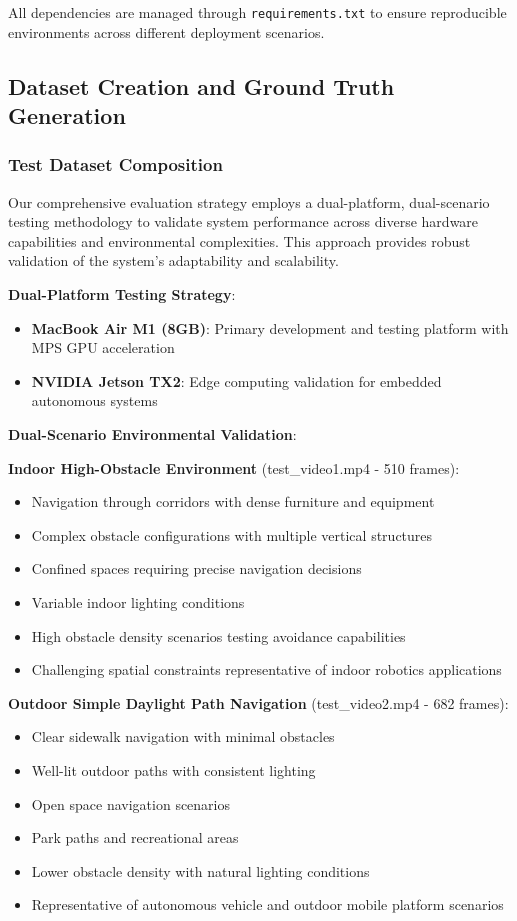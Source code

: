 \documentclass[10pt]{article}
\begin{document}
All dependencies are managed through \texttt{requirements.txt} to ensure reproducible environments across different deployment scenarios.

\subsection{Dataset Creation and Ground Truth Generation}

\subsubsection{Test Dataset Composition}

Our comprehensive evaluation strategy employs a dual-platform, dual-scenario testing methodology to validate system performance across diverse hardware capabilities and environmental complexities. This approach provides robust validation of the system's adaptability and scalability.

\textbf{Dual-Platform Testing Strategy}:
\begin{itemize}
\item \textbf{MacBook Air M1 (8GB)}: Primary development and testing platform with MPS GPU acceleration
\item \textbf{NVIDIA Jetson TX2}: Edge computing validation for embedded autonomous systems
\end{itemize}

\textbf{Dual-Scenario Environmental Validation}:

\textbf{Indoor High-Obstacle Environment} (test\_video1.mp4 - 510 frames):
\begin{itemize}
\item Navigation through corridors with dense furniture and equipment
\item Complex obstacle configurations with multiple vertical structures
\item Confined spaces requiring precise navigation decisions
\item Variable indoor lighting conditions
\item High obstacle density scenarios testing avoidance capabilities
\item Challenging spatial constraints representative of indoor robotics applications
\end{itemize}

\textbf{Outdoor Simple Daylight Path Navigation} (test\_video2.mp4 - 682 frames):
\begin{itemize}
\item Clear sidewalk navigation with minimal obstacles
\item Well-lit outdoor paths with consistent lighting
\item Open space navigation scenarios
\item Park paths and recreational areas
\item Lower obstacle density with natural lighting conditions
\item Representative of autonomous vehicle and outdoor mobile platform scenarios
\end{itemize}
\end{document}
